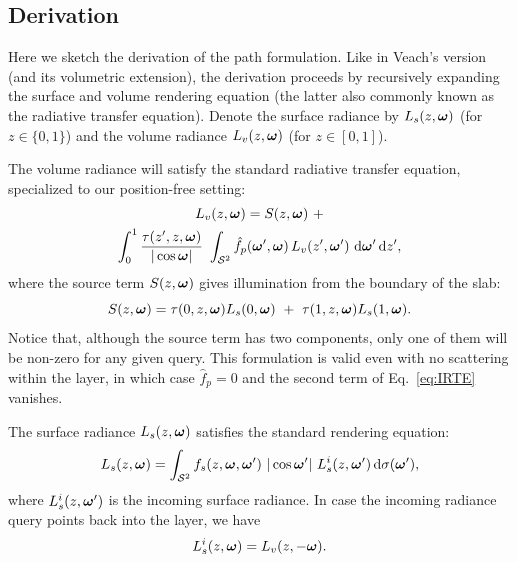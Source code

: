 \subsection{Derivation}

Here we sketch the derivation of the path formulation.
Like in Veach's version (and its volumetric extension), the derivation proceeds by recursively expanding the surface and volume rendering equation (the latter also commonly known as the radiative transfer equation). Denote the surface radiance by $L_s(z, \bm{\omega})$ (for $z \in \{0, 1\}$) and the volume radiance $L_v(z, \bm{\omega})$ (for $z \in [0,1]$).

The volume radiance will satisfy the standard radiative transfer equation, specialized to our position-free setting:
%
\begin{multline}
\label{eq:IRTE}
L_v(z, \bm{\omega}) = S(z, \bm{\omega}) \ + \\
\int_0^1 \frac{\tau(z', z, \bm{\omega})}{|\cos\bm{\omega}|} \, \, \int_{{\mathcal S^2}} \hat f_p(\bm{\omega}', \bm{\omega}) \, L_v(z', \bm{\omega}') \,\,\mathrm{d} \bm{\omega}' \,\mathrm{d} z',
\end{multline}
%
where the source term $S(z, \bm{\omega})$ gives illumination from the boundary of the slab:
%
\begin{equation}
S(z, \bm{\omega}) = \tau(0, z, \bm{\omega}) L_s(0, \bm{\omega}) \ + \ \tau(1, z, \bm{\omega}) L_s(1, \bm{\omega}).
\end{equation}
%
Notice that, although the source term has two components, only one of them will be non-zero for any given query.
This formulation is valid even with no scattering within the layer, in which case $\hat f_p = 0$ and the second term of Eq.~\eqref{eq:IRTE} vanishes.

The surface radiance $L_s(z, \bm{\omega})$ satisfies the standard rendering equation:
%
\begin{equation}
\label{eq:RE}
L_s(z, \bm{\omega}) = \int_{{\mathcal S^2}} f_s(z, \bm{\omega}, \bm{\omega}') \ |\cos \bm{\omega}'| \ L_s^i(z, \bm{\omega}') \,\mathrm{d} \sigma(\bm{\omega}'),
\end{equation}
where $L_s^i(z, \bm{\omega}')$ is the incoming surface radiance. In case the incoming radiance query points back into the layer, we have
\begin{equation}
\label{eq:incoming}
L_s^i(z, \bm{\omega}) = L_v(z, -\bm{\omega}).
\end{equation}

